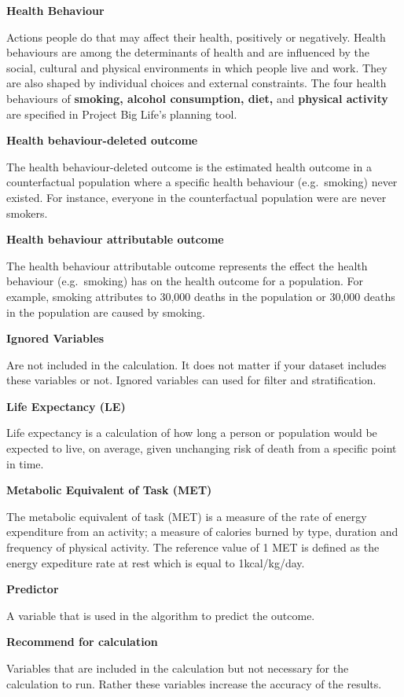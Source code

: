 \documentclass[]{book}
\begin{document}
\textbf{Health Behaviour}

Actions people do that may affect their health, positively or negatively. Health behaviours are among the determinants of health and are influenced by the social, cultural and physical environments in which people live and work.\citep{StatsCan2010} They are also shaped by individual choices and external constraints.\citep{StatsCan2010} The four health behaviours of \textbf{smoking, alcohol consumption, diet,} and \textbf{physical activity} are specified in Project Big Life's planning tool.

\textbf{Health behaviour-deleted outcome}

The health behaviour-deleted outcome is the estimated health outcome in a counterfactual population where a specific health behaviour (e.g.~smoking) never existed. For instance, everyone in the counterfactual population were are never smokers.

\textbf{Health behaviour attributable outcome}

The health behaviour attributable outcome represents the effect the health behaviour (e.g.~smoking) has on the health outcome for a population. For example, smoking attributes to 30,000 deaths in the population or 30,000 deaths in the population are caused by smoking.

\textbf{Ignored Variables}

Are not included in the calculation. It does not matter if your dataset includes these variables or not. Ignored variables can used for filter and stratification.

\textbf{Life Expectancy (LE)}

Life expectancy is a calculation of how long a person or population would be expected to live, on average, given unchanging risk of death from a specific point in time.

\textbf{Metabolic Equivalent of Task (MET)}

The metabolic equivalent of task (MET) is a measure of the rate of energy expenditure from an activity; a measure of calories burned by type, duration and frequency of physical activity. The reference value of 1 MET is defined as the energy expediture rate at rest which is equal to 1kcal/kg/day.

\textbf{Predictor}

A variable that is used in the algorithm to predict the outcome.

\textbf{Recommend for calculation}

Variables that are included in the calculation but not necessary for the calculation to run. Rather these variables increase the accuracy of the results.
\end{document}
